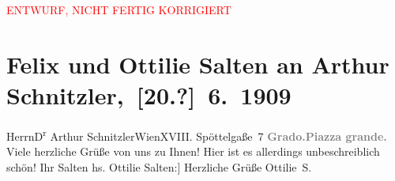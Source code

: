 
\begin{center}
            \textcolor{red}{ENTWURF, NICHT FERTIG KORRIGIERT}
                      \end{center}
            
         \renewcommand{\erwaehnteOrte}{Orte: Edmund-Weiß-Gasse 7, Grado, Piazza Duca D’Aosta, Wien}
         \renewcommand{\erwaehnteWerke}{}
               \section[ Felix und Ottilie Salten an Arthur Schnitzler, {[}20.?{]} 6. 1909]{ Felix und Ottilie Salten an Arthur Schnitzler, {[}20.?{]} 6. 1909}\nopagebreak{}\rehead{ }\begin{ledgroupsized}[t]{13cm}\normalsize\beginnumbering \toendnotes[C]{\smallbreak\pagebreak[2]} 
\toendnotes[C]{\smallbreak}\pstart{}{\pb}Herrn\pend{}\pstart{}D\textsuperscript{r} Arthur Schnitzler\pend{}\pstart{}Wien\pend{}\pstart{}XVIII. Spöttelgaße 7\pend{}{\bigskip}\pstart
           \noindent{}{\pb}\textcolor{gray}{\textbf{Grado.\hspace*{5em}Piazza grande.}}\pend
           \pstart
           {\pb}Viele herzliche Grüße von uns
               zu Ihnen! Hier ist es
               allerdings unbeschreiblich schön!\pend
           \pstart Ihr \spacefill\mbox{Salten}\pend{}{\bigskip}\pstart
           \noindent{}{[}hs. Ottilie Salten:{]} Herzliche Grüße\pend
           \pstart \spacefill\mbox{Ottilie S.}\pend{}
         
         \endnumbering{}\end{ledgroupsized}  \newcommand{\dateiname}{L03499}\newcommand{\titel}{Felix und Ottilie Salten an Arthur Schnitzler, [20.?] 6. 1909}\newcommand{\editorInnen}{Martin Anton Müller und Laura Untner}
      